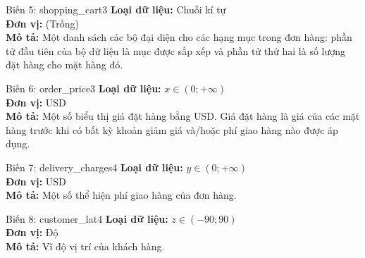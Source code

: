 \vspace{0.5cm}

\noindent
\begin{minipage}[t]{0.48\textwidth}
\begin{mainbox}{Biến 5: shopping\_cart}{3}
    \textbf{Loại dữ liệu:} Chuỗi kí tự \\
    \textbf{Đơn vị:} (Trống) \\
    \textbf{Mô tả:} Một danh sách các bộ đại diện cho các hạng mục trong đơn hàng: phần tử đầu tiên của bộ dữ liệu là mục được sắp xếp và phần tử thứ hai là số lượng đặt hàng cho mặt hàng đó.
\end{mainbox}
\end{minipage}
\hfill
\begin{minipage}[t]{0.48\textwidth}
\begin{mainbox}{Biến 6: order\_price}{3}
    \textbf{Loại dữ liệu:} \(x \in (0; +\infty)\) \\
    \textbf{Đơn vị:} USD \\
    \textbf{Mô tả:} Một số biểu thị giá đặt hàng bằng USD. Giá đặt hàng là giá của các mặt hàng trước khi có bất kỳ khoản giảm giá và/hoặc phí giao hàng nào được áp dụng.
\end{mainbox}
\end{minipage}

\vspace{0.5cm}

\noindent
\begin{minipage}[t]{0.48\textwidth}
\begin{mainbox}{Biến 7: delivery\_charges}{4}
    \textbf{Loại dữ liệu:} \(y \in (0; +\infty)\) \\
    \textbf{Đơn vị:} USD \\
    \textbf{Mô tả:} Một số thể hiện phí giao hàng của đơn hàng.
\end{mainbox}
\end{minipage}
\hfill
\begin{minipage}[t]{0.48\textwidth}
\begin{mainbox}{Biến 8: customer\_lat}{4}
    \textbf{Loại dữ liệu:} \(z \in (-90; 90)\) \\
    \textbf{Đơn vị:} Độ \\
    \textbf{Mô tả:} Vĩ độ vị trí của khách hàng.
\end{mainbox}
\end{minipage}

\vspace{0.5cm}

